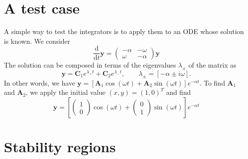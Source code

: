 \documentclass[10pt,a4paper]{article}
\newcommand{\bvec}[1]{\mathbf{#1}}
\newcommand{\dd}[0]{ \mathrm{d} }
\begin{document}
\section{A test case}
A simple way to test the integrators is to apply them to an ODE whose solution is known.
We consider
\begin{equation*}
  \frac{\dd}{\dd t} \bvec{y} = \begin{pmatrix}
    -\alpha & -\omega \\
    \omega & -\alpha \end{pmatrix} \bvec{y}
\end{equation*}
The solution can be composed in terms of the eigenvalues $\lambda_\pm$ of the matrix as
\begin{equation*}
  \bvec{y} = \bvec{C}_1e^{\lambda_+t} + \bvec{C}_2e^{\lambda_-t}, \qquad \lambda_\pm = \left[-\alpha \pm i \omega\right].
\end{equation*}
In other words, we have $\bvec{y} = \left[ \bvec{A}_1\cos(\omega t) + \bvec{A}_2 \sin(\omega t) \right]e^{-\alpha t}.$
To find $\bvec{A}_1$ and $\bvec{A}_2$, we apply the initial value $(x,y) = (1,0)^T$ and find
\begin{equation*}
  \bvec{y} = \left[ \begin{pmatrix} 1 \\ 0 \end{pmatrix} \cos(\omega t) +
  \begin{pmatrix} 0 \\ 1 \end{pmatrix} \sin( \omega t ) \right]e^{-\alpha t}
\end{equation*}

\section{Stability regions}
\end{document}
